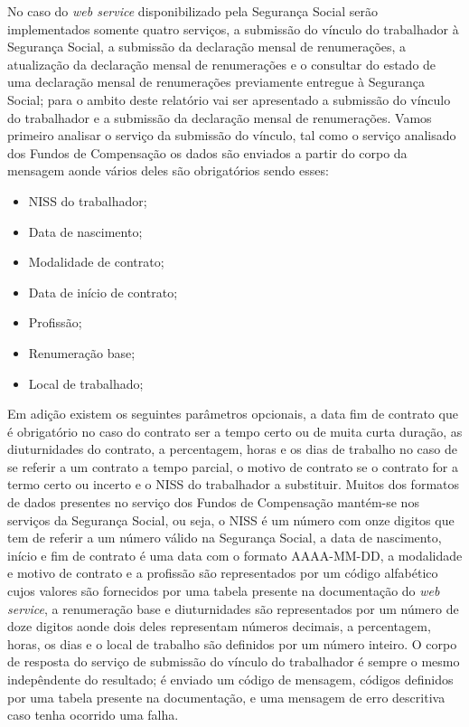 \documentclass[sigplan]{acmart}
\begin{document}
No caso do \textit{web service} disponibilizado pela Segurança Social serão implementados somente quatro serviços, a submissão do vínculo do trabalhador à Segurança Social, a submissão da declaração mensal de renumerações, a atualização da declaração mensal de renumerações e o consultar do estado de uma declaração mensal de renumerações previamente entregue à Segurança Social; para o ambito deste relatório vai ser apresentado a submissão do vínculo do trabalhador e a submissão da declaração mensal de renumerações. Vamos primeiro analisar o serviço da submissão do vínculo, tal como o serviço analisado dos Fundos de Compensação os dados são enviados a partir do corpo da mensagem aonde vários deles são obrigatórios sendo esses:
\begin{itemize}
  \item NISS do trabalhador;
  \item Data de nascimento;
  \item Modalidade de contrato;
  \item Data de início de contrato;
  \item Profissão;
  \item Renumeração base;
  \item Local de trabalhado;
\end{itemize}
Em adição existem os seguintes parâmetros opcionais, a data fim de contrato que é obrigatório no caso do contrato ser a tempo certo ou de muita curta duração, as diuturnidades do contrato, a percentagem, horas e os dias de trabalho no caso de se referir a um contrato a tempo parcial, o motivo de contrato se o contrato for a termo certo ou incerto e o NISS do trabalhador a substituir. Muitos dos formatos de dados presentes no serviço dos Fundos de Compensação mantém-se nos serviços da Segurança Social, ou seja, o NISS é um número com onze digitos que tem de referir a um número válido na Segurança Social, a data de nascimento, início e fim de contrato é uma data com o formato AAAA-MM-DD, a modalidade e motivo de contrato e a profissão são representados por um código alfabético cujos valores são fornecidos por uma tabela presente na documentação do \textit{web service}, a renumeração base e diuturnidades são representados por um número de doze digitos aonde dois deles representam números decimais, a percentagem, horas, os dias e o local de trabalho são definidos por um número inteiro. O corpo de resposta do serviço de submissão do vínculo do trabalhador é sempre o mesmo indepêndente do resultado; é enviado um código de mensagem, códigos definidos por uma tabela presente na documentação, e uma mensagem de erro descritiva caso tenha ocorrido uma falha.
\end{document}
